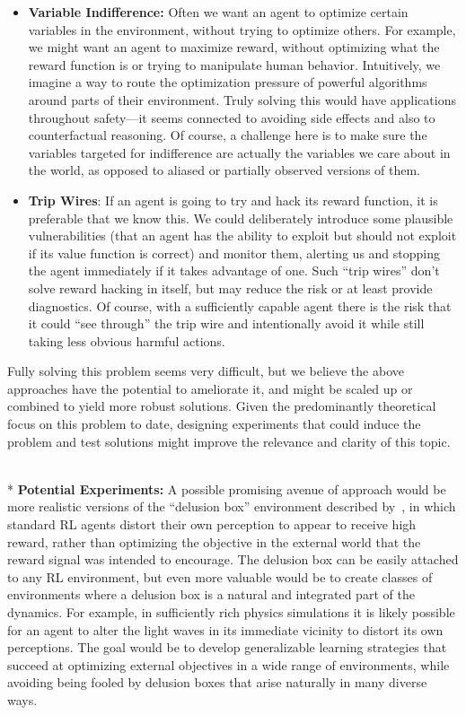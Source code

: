 \documentclass[a4paper,10pt]{article}
\begin{document}
\begin{itemize}
\item {\bf Variable Indifference:} Often we want an agent to optimize certain variables in the environment, without trying to optimize others. For example, we might want an agent to maximize reward, without optimizing what the reward function is or trying to manipulate human behavior. Intuitively, we imagine a way to route the optimization pressure of powerful algorithms around parts of their environment. Truly solving this would have applications throughout safety---it seems connected to avoiding side effects and also to counterfactual reasoning.  Of course, a challenge here is to make sure the variables targeted for indifference are actually the variables we care about in the world, as opposed to aliased or partially observed versions of them.

\item {\bf Trip Wires}: If an agent is going to try and hack its reward function, it is preferable that we know this. We could deliberately introduce some plausible vulnerabilities (that an agent has the ability to exploit but should not exploit if its value function is correct) and monitor them, alerting us and stopping the agent immediately if it takes advantage of one. Such ``trip wires'' don’t solve reward hacking in itself, but may reduce the risk or at least provide diagnostics. Of course, with a sufficiently capable agent there is the risk that it could ``see through'' the trip wire and intentionally avoid it while still taking less obvious harmful actions.
\end{itemize}

Fully solving this problem seems very difficult, but we believe the above approaches have the potential to ameliorate it, and might be scaled up or combined to yield more robust solutions.  Given the predominantly theoretical focus on this problem to date, designing experiments that could induce the problem and test solutions might improve the relevance and clarity of this topic.

$~$\\* {\bf Potential Experiments:}  A possible promising avenue of approach would be more realistic versions of the ``delusion box'' environment described by~\cite{ring2011delusion}, in which standard RL agents distort their own perception to appear to receive high reward, rather than optimizing the objective in the external world that the reward signal was intended to encourage. The delusion box can be easily attached to any RL environment, but even more valuable would be to create classes of environments where a delusion box is a natural and integrated part of the dynamics.  For example, in sufficiently rich physics simulations it is likely possible for an agent to alter the light waves in its immediate vicinity to distort its own perceptions.  The goal would be to develop generalizable learning strategies that succeed at optimizing external objectives in a wide range of environments, while avoiding being fooled by delusion boxes that arise naturally in many diverse ways.
\end{document}
